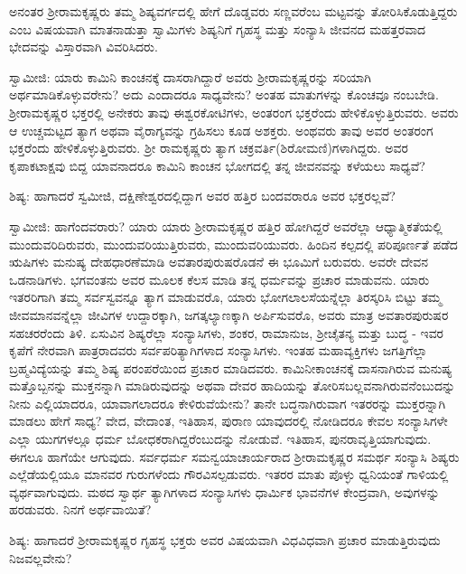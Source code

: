 ಅನಂತರ ಶ‍್ರೀರಾಮಕೃಷ್ಣರು ತಮ್ಮ ಶಿಷ್ಯವರ್ಗದಲ್ಲಿ ಹೇಗೆ ದೊಡ್ಡವರು ಸಣ್ಣವರೆಂಬ ಮಟ್ಟವನ್ನು ತೋರಿಸಿಕೊಡುತ್ತಿದ್ದರು ಎಂಬ ವಿಷಯವಾಗಿ ಮಾತನಾಡುತ್ತಾ ಸ್ವಾಮಿಗಳು ಶಿಷ್ಯನಿಗೆ ಗೃಹಸ್ಥ ಮತ್ತು ಸಂನ್ಯಾಸಿ ಜೀವನದ ಮಹತ್ತರವಾದ ಭೇದವನ್ನು ವಿಸ್ತಾರವಾಗಿ ವಿವರಿಸಿದರು.

ಸ್ವಾಮೀಜಿ: ಯಾರು ಕಾಮಿನಿ ಕಾಂಚನಕ್ಕೆ ದಾಸರಾಗಿದ್ದಾರೆ ಅವರು ಶ‍್ರೀರಾಮಕೃಷ್ಣರನ್ನು ಸರಿಯಾಗಿ ಅರ್ಥಮಾಡಿಕೊಳ್ಳುವರೇನು? ಅದು ಎಂದಾದರೂ ಸಾಧ್ಯವೇನು? ಅಂತಹ ಮಾತುಗಳನ್ನು ಕೊಂಚವೂ ನಂಬಬೇಡಿ. ಶ‍್ರೀರಾಮಕೃಷ್ಣರ ಭಕ್ತರಲ್ಲಿ ಅನೇಕರು ತಾವು ಈಶ್ವರಕೋಟಿಗಳು, ಅಂತರಂಗ ಭಕ್ತರೆಂದು ಹೇಳಿಕೊಳ್ಳುತ್ತಿರುವರು. ಅವರು ಆ ಉಚ್ಚಮಟ್ಟದ ತ್ಯಾಗ ಅಥವಾ ವೈರಾಗ್ಯವನ್ನು ಗ್ರಹಿಸಲು ಕೂಡ ಅಶಕ್ತರು. ಅಂಥವರು ತಾವು ಅವರ ಅಂತರಂಗ ಭಕ್ತರೆಂದು ಹೇಳಿಕೊಳ್ಳುತ್ತಿರುವರು. ಶ‍್ರೀ ರಾಮಕೃಷ್ಣರು ತ್ಯಾಗ ಚಕ್ರವರ್ತಿ(ಶಿರೋಮಣಿ)ಗಳಾಗಿದ್ದರು. ಅವರ ಕೃಪಾಕಟಾಕ್ಷವು ಬಿದ್ದ ಯಾವನಾದರೂ ಕಾಮಿನಿ ಕಾಂಚನ ಭೋಗದಲ್ಲಿ ತನ್ನ ಜೀವನವನ್ನು ಕಳೆಯಲು ಸಾಧ್ಯವೆ?

ಶಿಷ್ಯ: ಹಾಗಾದರೆ ಸ್ವಮೀಜಿ, ದಕ್ಷಿಣೇಶ್ವರದಲ್ಲಿದ್ದಾಗ ಅವರ ಹತ್ತಿರ ಬಂದವರಾರೂ ಅವರ ಭಕ್ತರಲ್ಲವೆ?

ಸ್ವಾಮೀಜಿ: ಹಾಗೆಂದವರಾರು? ಯಾರು ಯಾರು ಶ‍್ರೀರಾಮಕೃಷ್ಣರ ಹತ್ತಿರ ಹೋಗಿದ್ದರೆ ಅವರೆಲ್ಲಾ ಆಧ್ಯಾತ್ಮಿಕತೆಯಲ್ಲಿ ಮುಂದುವರಿದಿರುವರು, ಮುಂದುವರಿಯುತ್ತಿರುವರು, ಮುಂದುವರಿಯುವರು. ಹಿಂದಿನ ಕಲ್ಪದಲ್ಲಿ ಪರಿಪೂರ್ಣತೆ ಪಡೆದ ಋಷಿಗಳು ಮನುಷ್ಯ ದೇಹಧಾರಣೆಮಾಡಿ ಅವತಾರಪುರುಷರೊಡನೆ ಈ ಭೂಮಿಗೆ ಬರುವರು. ಅವರೇ ದೇವನ ಒಡನಾಡಿಗಳು. ಭಗವಂತನು ಅವರ ಮೂಲಕ ಕೆಲಸ ಮಾಡಿ ತನ್ನ ಧರ್ಮವನ್ನು ಪ್ರಚಾರ ಮಾಡುವನು. ಯಾರು ಇತರರಿಗಾಗಿ ತಮ್ಮ ಸರ್ವಸ್ವವನ್ನೂ ತ್ಯಾಗ ಮಾಡುವರೊ, ಯಾರು ಭೋಗಲಾಲಸೆಯನ್ನೆಲ್ಲಾ ತಿರಸ್ಕರಿಸಿ ಬಿಟ್ಟು ತಮ್ಮ ಜೀವಮಾನವನ್ನೆಲ್ಲಾ ಜೀವಿಗಳ ಉದ್ದಾರಕ್ಕಾಗಿ, ಜಗತ್ಕಲ್ಯಾಣಕ್ಕಾಗಿ ಅರ್ಪಿಸುವರೊ, ಅವರು ಮಾತ್ರ ಅವತಾರಪುರುಷರ ಸಹಚರರೆಂದು ತಿಳಿ. ಏಸುವಿನ ಶಿಷ್ಯರೆಲ್ಲಾ ಸಂನ್ಯಾಸಿಗಳು, ಶಂಕರ, ರಾಮಾನುಜ, ಶ‍್ರೀಚೈತನ್ಯ ಮತ್ತು ಬುದ್ಧ - ಇವರ ಕೃಪೆಗೆ ನೇರವಾಗಿ ಪಾತ್ರರಾದವರು ಸರ್ವಪರಿತ್ಯಾಗಿಗಳಾದ ಸಂನ್ಯಾಸಿಗಳು. ಇಂತಹ ಮಹಾವ್ಯಕ್ತಿಗಳು ಜಗತ್ತಿಗೆಲ್ಲಾ ಬ್ರಹ್ಮವಿದ್ಯೆಯನ್ನು ತಮ್ಮ ಶಿಷ್ಯ ಪರಂಪರೆಯಿಂದ ಪ್ರಚಾರ ಮಾಡಿದವರು. ಕಾಮಿನೀಕಾಂಚನಕ್ಕೆ ದಾಸನಾಗಿರುವ ಮನುಷ್ಯ ಮತ್ತೊಬ್ಬನನ್ನು ಮುಕ್ತನನ್ನಾಗಿ ಮಾಡಿರುವುದನ್ನು ಅಥವಾ ದೇವರ ಹಾದಿಯನ್ನು ತೋರಿಸಬಲ್ಲವನಾಗಿರುವನೆಂಬುದನ್ನು ನೀನು ಎಲ್ಲಿಯಾದರೂ, ಯಾವಾಗಲಾದರೂ ಕೇಳಿರುವೆಯೇನು? ತಾನೇ ಬದ್ಧನಾಗಿರುವಾಗ ಇತರರನ್ನು ಮುಕ್ತರನ್ನಾಗಿ ಮಾಡಲು ಹೇಗೆ ಸಾಧ್ಯ? ವೇದ, ವೇದಾಂತ, ಇತಿಹಾಸ, ಪುರಾಣ ಯಾವುದರಲ್ಲಿ ನೋಡಿದರೂ ಕೇವಲ ಸಂನ್ಯಾಸಿಗಳೇ ಎಲ್ಲಾ ಯುಗಗಳಲ್ಲೂ ಧರ್ಮ ಬೋಧಕರಾಗಿದ್ದರೆಂಬುದನ್ನು ನೋಡುವೆ. ಇತಿಹಾಸ, ಪುನರಾವೃತ್ತಿಯಾಗುವುದು. ಈಗಲೂ ಹಾಗೆಯೇ ಆಗುವುದು. ಸರ್ವಧರ್ಮ ಸಮನ್ವಯಾಚಾರ್ಯರಾದ ಶ‍್ರೀರಾಮಕೃಷ್ಣರ ಸಮರ್ಥ ಸಂನ್ಯಾಸಿ ಶಿಷ್ಯರು ಎಲ್ಲೆಡೆಯಲ್ಲಿಯೂ ಮಾನವರ ಗುರುಗಳೆಂದು ಗೌರವಿಸಲ್ಪಡುವರು. ಇತರರ ಮಾತು ಪೊಳ್ಳು ಧ್ವನಿಯಂತೆ ಗಾಳಿಯಲ್ಲಿ ವ್ಯರ್ಥವಾಗುವುದು. ಮಠದ ಸ್ವಾರ್ಥ ತ್ಯಾಗಿಗಳಾದ ಸಂನ್ಯಾಸಿಗಳು ಧಾರ್ಮಿಕ ಭಾವನೆಗಳ ಕೇಂದ್ರವಾಗಿ, ಅವುಗಳನ್ನು ಹರಡುವರು. ನಿನಗೆ ಅರ್ಥವಾಯಿತೆ?

ಶಿಷ್ಯ: ಹಾಗಾದರೆ ಶ‍್ರೀರಾಮಕೃಷ್ಣರ ಗೃಹಸ್ಥ ಭಕ್ತರು ಅವರ ವಿಷಯವಾಗಿ ವಿಧವಿಧವಾಗಿ ಪ್ರಚಾರ ಮಾಡುತ್ತಿರುವುದು ನಿಜವಲ್ಲವೇನು?

